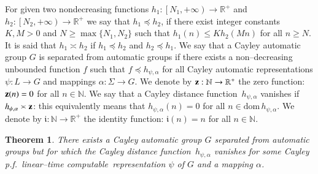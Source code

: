 \documentclass[article,12pt]{elsarticle}
\newtheorem{theorem}{Theorem}
\newcommand\distfun{Cayley distance function}
\newcommand\linearC{Cayley p.f.~linear--time computable}
\begin{document}
 
 For given two nondecreasing functions 
 $h_1 : \left[N_1,+ \infty \right) \rightarrow \mathbb{R}^{+}$ 
 and $h_2 : \left[N_2, +\infty \right) \rightarrow \mathbb{R}^{+}$
 we say that $h_1 \preceq h_2$, if
 there exist integer constants 
 $K,M>0$ and 
 $N \geqslant \max \{N_1,N_2 \}$ such that 
 $h_1 (n) \leqslant K h_2 (Mn)$ for all 
 $n \geqslant N$. It is said that  
 $h_1 \asymp h_2$ if $h_1 \preceq h_2$ and 
 $h_2 \preceq h_1$. 
 We say that a Cayley automatic group $G$ is separated 
 from automatic groups if there exists a 
 non--decreasing unbounded function $f$ such that 
 $f \preceq h_{\psi,\alpha}$ for all Cayley automatic 
 representations $\psi : L \rightarrow G$ and 
 mappings $\alpha: \Sigma \rightarrow G$.  
 We denote by $\bold{z} : \mathbb{N} 
 \rightarrow \mathbb{R}^{+}$ the zero function: 
 $\bold{z} (n) = 0$ for all $n \in \mathbb{N}$. 
 We say that a \distfun\ $h_{\psi,\alpha}$ 
 vanishes if $h_{\psi,\alpha} \asymp \bold{z}$: 
 this equivalently means that 
 $h_{\psi,\alpha}(n) = 0$ for 
 all $n \in \mathrm{dom} \,h_{\psi,\alpha}$.  
 We denote by $\mathfrak{i}: \mathbb{N} \rightarrow 
 \mathbb{R}^+$ the identity function: 
 $\mathfrak{i}(n) = n$ for all $n \in \mathbb{N}$. 
 \begin{theorem} 
 \label{lamplighter_theorem}	
 There exists a Cayley automatic 
 group $G$ separated from automatic groups but  
 for which the \distfun\ $h_{\psi,\alpha}$ 
 vanishes
 for some 
 \linearC\ representation $\psi$ 
 of $G$ and a mapping $\alpha$.      
 \end{theorem}
\end{document}
